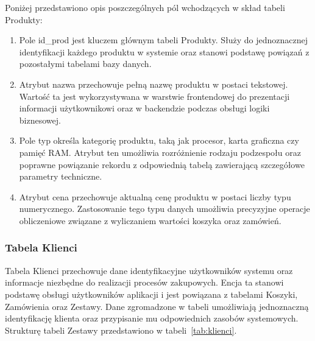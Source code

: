 \documentclass[a4paper,twoside,12pt]{book}
\begin{document}
\vspace{0.5cm}
Poniżej przedstawiono opis poszczególnych pól wchodzących w skład tabeli Produkty:
\begin{enumerate}
    \item Pole id\_prod jest kluczem głównym tabeli Produkty. Służy do jednoznacznej
    identyfikacji każdego produktu w systemie oraz stanowi podstawę powiązań
    z pozostałymi tabelami bazy danych.

    \item Atrybut nazwa przechowuje pełną nazwę produktu w postaci tekstowej.
    Wartość ta jest wykorzystywana w warstwie frontendowej do prezentacji
    informacji użytkownikowi oraz w backendzie podczas obsługi logiki biznesowej.

    \item Pole typ określa kategorię produktu, taką jak procesor, karta graficzna
    czy pamięć RAM. Atrybut ten umożliwia rozróżnienie rodzaju podzespołu oraz
    poprawne powiązanie rekordu z odpowiednią tabelą zawierającą szczegółowe
    parametry techniczne.

    \item Atrybut cena przechowuje aktualną cenę produktu w postaci liczby typu
    numerycznego. Zastosowanie tego typu danych umożliwia precyzyjne operacje
    obliczeniowe związane z wyliczaniem wartości koszyka oraz zamówień.
\end{enumerate}

\newpage 

\subsubsection{Tabela Klienci}
Tabela Klienci przechowuje dane identyfikacyjne użytkowników systemu oraz informacje
niezbędne do realizacji procesów zakupowych. Encja ta stanowi podstawę obsługi
użytkowników aplikacji i jest powiązana z tabelami Koszyki, Zamówienia oraz Zestawy.
Dane zgromadzone w tabeli umożliwiają jednoznaczną identyfikację klienta oraz
przypisanie mu odpowiednich zasobów systemowych. Strukturę tabeli Zestawy przedstawiono w tabeli~\ref{tab:klienci}.
\end{document}
